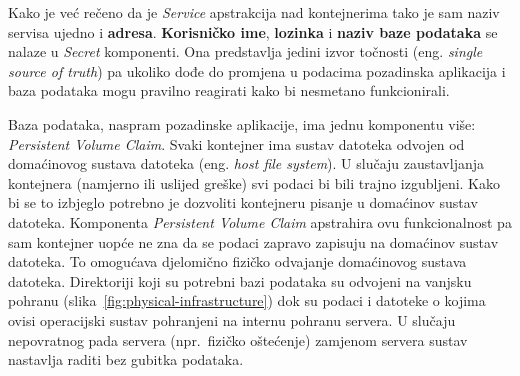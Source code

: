 Kako je već rečeno da je \textit{Service} apstrakcija nad kontejnerima tako je sam naziv servisa ujedno i \textbf{adresa}.
\textbf{Korisničko ime}, \textbf{lozinka} i \textbf{naziv baze podataka} se nalaze u \textit{Secret} komponenti.
Ona predstavlja jedini izvor točnosti (eng. \textit{single source of truth}) pa ukoliko dođe do promjena
u podacima pozadinska aplikacija i baza podataka mogu pravilno reagirati kako bi nesmetano funkcionirali.

Baza podataka, naspram pozadinske aplikacije, ima jednu komponentu više: \textit{Persistent Volume Claim}.
Svaki kontejner ima sustav datoteka odvojen od domaćinovog sustava datoteka (eng. \textit{host file system}).
U slučaju zaustavljanja kontejnera (namjerno ili uslijed greške) svi podaci bi bili trajno izgubljeni.
Kako bi se to izbjeglo potrebno je dozvoliti kontejneru pisanje u domaćinov sustav datoteka.
Komponenta \textit{Persistent Volume Claim} apstrahira ovu funkcionalnost pa sam kontejner uopće ne zna da se podaci zapravo
zapisuju na domaćinov sustav datoteka.
To omogućava djelomično fizičko odvajanje domaćinovog sustava datoteka.
Direktoriji koji su potrebni bazi podataka su odvojeni na vanjsku pohranu (slika~\ref{fig:physical-infrastructure}) dok su
podaci i datoteke o kojima ovisi operacijski sustav pohranjeni na internu pohranu servera.
U slučaju nepovratnog pada servera (npr.~fizičko oštećenje) zamjenom servera sustav nastavlja raditi bez gubitka podataka.